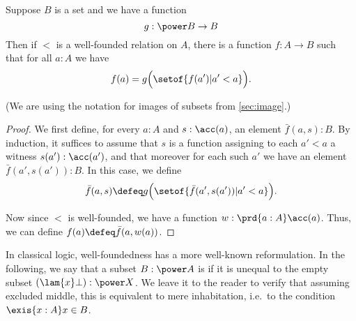 \begin{lem}\label{thm:wfrec}
  Suppose $B$ is a set and we have a function
  \[ g : \power B \to B \]
  Then if $<$ is a well-founded relation on $A$, there is a function $f:A\to B$ such that for all $a:A$ we have
  \begin{equation*}
    f(a) = g\Big(\setof{ f(a') | a'<a }\Big).
  \end{equation*}
\end{lem}
\noindent
(We are using the notation for images of subsets from \cref{sec:image}.)
\begin{proof}
  We first define, for every $a:A$ and $s:\acc(a)$, an element $\bar f(a,s):B$.
  By induction, it suffices to assume that $s$ is a function assigning to each $a'<a$ a witness $s(a'):\acc(a')$, and that moreover for each such $a'$ we have an element $\bar f(a',s(a')):B$.
  In this case, we define
  \begin{equation*}
    \bar f(a,s) \defeq g\Big(\setof{ \bar f(a',s(a')) | a'<a }\Big).
  \end{equation*}

  Now since $<$ is well-founded, we have a function $w:\prd{a:A} \acc(a)$.
  Thus, we can define $f(a)\defeq \bar f (a,w(a))$.
\end{proof}

In classical logic, well-foundedness has a more well-known reformulation.
In the following, we say that a subset $B: \power A$ is 
if it is unequal to the empty subset $(\lam{x}\bot) : \power X$.
We leave it to the reader to verify that assuming excluded middle, this is equivalent to mere inhabitation, i.e.\ to the condition $\exis{x:A} x\in B$.


